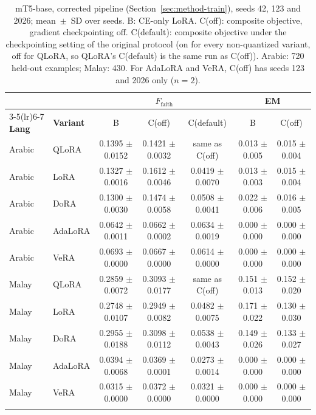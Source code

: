 \begin{table}[t]
\centering
\caption{mT5-base, corrected pipeline (Section~\ref{sec:method-train}), seeds 42, 123 and 2026; mean~$\pm$~SD over seeds. B: CE-only LoRA. C(off): composite objective, gradient checkpointing off. C(default): composite objective under the checkpointing setting of the original protocol (on for every non-quantized variant, off for QLoRA, so QLoRA's C(default) is the same run as C(off)). Arabic: 720 held-out examples; Malay: 430. For AdaLoRA and VeRA, C(off) has seeds 123 and 2026 only ($n=2$).}
\label{tab:main}
\footnotesize
\begin{tabular}{@{}llccccc@{}}
\toprule
& & \multicolumn{3}{c}{$F_{\text{faith}}$} & \multicolumn{2}{c}{EM} \\
\cmidrule(lr){3-5}\cmidrule(lr){6-7}
\textbf{Lang} & \textbf{Variant} & B & C(off) & C(default) & B & C(off) \\
\midrule
Arabic & QLoRA & 0.1395 $\pm$ 0.0152 & 0.1421 $\pm$ 0.0032 & same as C(off) & 0.013 $\pm$ 0.005 & 0.015 $\pm$ 0.004 \\
Arabic & LoRA & 0.1327 $\pm$ 0.0016 & 0.1612 $\pm$ 0.0046 & 0.0419 $\pm$ 0.0070 & 0.013 $\pm$ 0.003 & 0.015 $\pm$ 0.004 \\
Arabic & DoRA & 0.1300 $\pm$ 0.0030 & 0.1474 $\pm$ 0.0058 & 0.0508 $\pm$ 0.0041 & 0.022 $\pm$ 0.006 & 0.016 $\pm$ 0.005 \\
Arabic & AdaLoRA & 0.0642 $\pm$ 0.0011 & 0.0662 $\pm$ 0.0002 & 0.0634 $\pm$ 0.0019 & 0.000 $\pm$ 0.000 & 0.000 $\pm$ 0.000 \\
Arabic & VeRA & 0.0693 $\pm$ 0.0000 & 0.0667 $\pm$ 0.0000 & 0.0614 $\pm$ 0.0000 & 0.000 $\pm$ 0.000 & 0.000 $\pm$ 0.000 \\
\midrule
Malay & QLoRA & 0.2859 $\pm$ 0.0072 & 0.3093 $\pm$ 0.0177 & same as C(off) & 0.151 $\pm$ 0.013 & 0.152 $\pm$ 0.020 \\
Malay & LoRA & 0.2748 $\pm$ 0.0107 & 0.2949 $\pm$ 0.0082 & 0.0482 $\pm$ 0.0075 & 0.171 $\pm$ 0.022 & 0.130 $\pm$ 0.030 \\
Malay & DoRA & 0.2955 $\pm$ 0.0188 & 0.3098 $\pm$ 0.0112 & 0.0538 $\pm$ 0.0043 & 0.149 $\pm$ 0.026 & 0.133 $\pm$ 0.027 \\
Malay & AdaLoRA & 0.0394 $\pm$ 0.0068 & 0.0369 $\pm$ 0.0001 & 0.0273 $\pm$ 0.0014 & 0.000 $\pm$ 0.000 & 0.000 $\pm$ 0.000 \\
Malay & VeRA & 0.0315 $\pm$ 0.0000 & 0.0372 $\pm$ 0.0000 & 0.0321 $\pm$ 0.0000 & 0.000 $\pm$ 0.000 & 0.000 $\pm$ 0.000 \\
\botrule
\end{tabular}
\end{table}